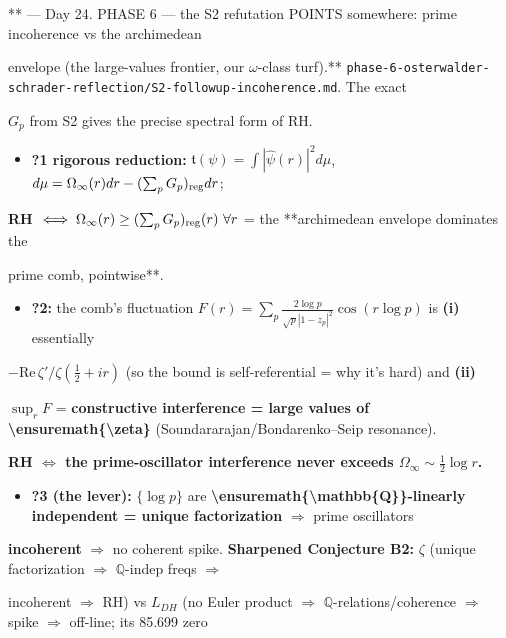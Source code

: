 \documentclass[10pt]{article}
\begin{document}
** --- Day 24. PHASE 6 --- the S2 refutation POINTS somewhere: prime incoherence vs the archimedean\par
envelope (the large-values frontier, our \ensuremath{\omega}-class turf).** \texttt{phase-6-osterwalder-schrader-reflection/S2-followup-incoherence.md}. The exact\par
$G_p$ from S2 gives the precise spectral form of RH.\par
\begin{itemize}
\item \textbf{?1 rigorous reduction:} $\mathfrak t(\psi)=\int|\widehat\psi(r)|^2 d\mu$, $d\mu=\Omega_\infty(r)dr-(\sum_p G_p)_{\rm reg}dr$;
\end{itemize}
  \textbf{RH $\iff\Omega_\infty(r)\ge(\sum_p G_p)_{\rm reg}(r)\ \forall r$} = the **archimedean envelope dominates the\par
  prime comb, pointwise**.\par
\begin{itemize}
\item \textbf{?2:} the comb's fluctuation $F(r)=\sum_p\frac{2\log p}{\sqrt p|1-z_p|^2}\cos(r\log p)$ is \textbf{(i)} essentially
\end{itemize}
  $-\mathrm{Re}\,\zeta'/\zeta(\tfrac12+ir)$ (so the bound is self-referential = why it's hard) and \textbf{(ii)}\par
  $\sup_r F$ = \textbf{constructive interference = large values of \textbackslash{}ensuremath\{\textbackslash{}zeta\}} (Soundararajan/Bondarenko--Seip resonance).\par
  \textbf{RH $\iff$ the prime-oscillator interference never exceeds $\Omega_\infty\sim\tfrac12\log r$.}\par
\begin{itemize}
\item \textbf{?3 (the lever):} $\{\log p\}$ are \textbf{\textbackslash{}ensuremath\{\textbackslash{}mathbb\{Q\}\}-linearly independent = unique factorization} \ensuremath{\Rightarrow} prime oscillators
\end{itemize}
  \textbf{incoherent} \ensuremath{\Rightarrow} no coherent spike. \textbf{Sharpened Conjecture B2:} \ensuremath{\zeta} (unique factorization \ensuremath{\Rightarrow} \ensuremath{\mathbb{Q}}-indep freqs \ensuremath{\Rightarrow}\par
  incoherent \ensuremath{\Rightarrow} RH) vs $L_{DH}$ (no Euler product \ensuremath{\Rightarrow} \ensuremath{\mathbb{Q}}-relations/coherence \ensuremath{\Rightarrow} spike \ensuremath{\Rightarrow} off-line; its 85.699 zero\par
\end{document}
